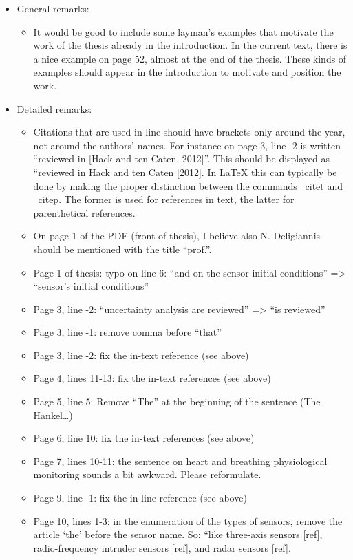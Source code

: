 \documentclass[11pt]{article}
\begin{document}
\begin{itemize}
    \item General remarks:
    \begin{itemize}
    \item  It would be good to include some layman’s examples that motivate the work of the thesis already in the introduction. In the current text, there is a nice example on page 52, almost at the end of the thesis. These kinds of examples should appear in the introduction to motivate and position the work.
    
    \end{itemize}
    \item Detailed remarks:
    
    
    \begin{itemize}
    \item Citations that are used in-line should have brackets only around the year, not around the authors’ names. For instance on page 3, line -2 is written “reviewed in [Hack and ten Caten, 2012]”. This should be displayed as “reviewed in Hack and ten Caten [2012]. In LaTeX this can typically be done by making the proper distinction between the commands \ citet and \ citep. The former is used for references in text, the latter for parenthetical references.
    \item  On page 1 of the PDF (front of thesis), I believe also N. Deligiannis should be mentioned with the title “prof.”. 
    \item Page 1 of thesis: typo on line 6: “and on the sensor initial conditions” => “sensor’s initial conditions”
    \item Page 3, line -2: “uncertainty analysis are reviewed” => “is reviewed”
    \item Page 3, line -1: remove comma before “that”
    \item Page 3, line -2: fix the in-text reference (see above)
    \item Page 4, lines 11-13: fix the in-text references (see above)
    \item Page 5, line 5: Remove “The” at the beginning of the sentence (The Hankel…)
    \item Page 6, line 10: fix the in-text references (see above)
    \item Page 7, lines 10-11: the sentence on heart and breathing physiological monitoring sounds a bit awkward. Please reformulate.
    \item Page 9, line -1: fix the in-line reference (see above)
    \item Page 10, lines 1-3: in the enumeration of the types of sensors, remove the article ‘the’ before the sensor name. So: “like three-axis sensors [ref], radio-frequency intruder sensors [ref], and radar sensors [ref]. 

\end{itemize}
\end{itemize}
\end{document}
